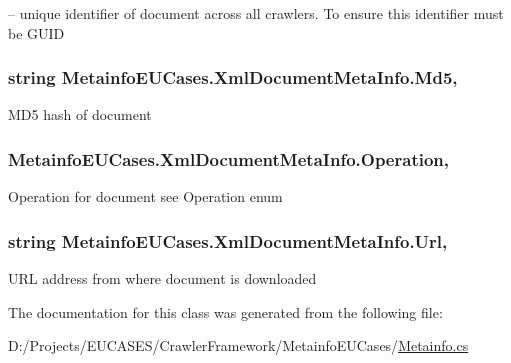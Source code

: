 – unique identifier of document across all crawlers. To ensure this identifier must be G\-U\-I\-D 

\hypertarget{class_metainfo_e_u_cases_1_1_xml_document_meta_info_a6eeb8c74f856afe415d9d9fa4ade30e7}{
\subsubsection[{Md5}]{\setlength{\rightskip}{0pt plus 5cm}string Metainfo\-E\-U\-Cases.\-Xml\-Document\-Meta\-Info.\-Md5\hspace{0.3cm}{\ttfamily [get]}, {\ttfamily [set]}}}\label{class_metainfo_e_u_cases_1_1_xml_document_meta_info_a6eeb8c74f856afe415d9d9fa4ade30e7}


M\-D5 hash of document 

\hypertarget{class_metainfo_e_u_cases_1_1_xml_document_meta_info_a9671a5e22bc342730f75ec4d50880539}{
\subsubsection[{Operation}]{ Metainfo\-E\-U\-Cases.\-Xml\-Document\-Meta\-Info.\-Operation\hspace{0.3cm}{\ttfamily [get]}, {\ttfamily [set]}}}\label{class_metainfo_e_u_cases_1_1_xml_document_meta_info_a9671a5e22bc342730f75ec4d50880539}


Operation for document see Operation enum 

\hypertarget{class_metainfo_e_u_cases_1_1_xml_document_meta_info_a713b2a1168b315354a4d0e47aba855d6}{
\subsubsection[{Url}]{\setlength{\rightskip}{0pt plus 5cm}string Metainfo\-E\-U\-Cases.\-Xml\-Document\-Meta\-Info.\-Url\hspace{0.3cm}{\ttfamily [get]}, {\ttfamily [set]}}}\label{class_metainfo_e_u_cases_1_1_xml_document_meta_info_a713b2a1168b315354a4d0e47aba855d6}


U\-R\-L address from where document is downloaded 



The documentation for this class was generated from the following file\-:\begin{DoxyCompactItemize}
\item 
D\-:/\-Projects/\-E\-U\-C\-A\-S\-E\-S/\-Crawler\-Framework/\-Metainfo\-E\-U\-Cases/\hyperlink{_metainfo_8cs}{Metainfo.\-cs}\end{DoxyCompactItemize}
